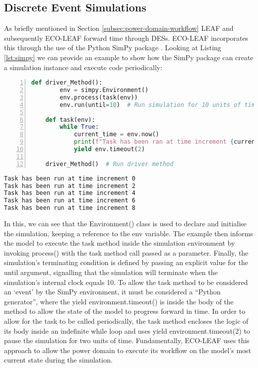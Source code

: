\documentclass{l4proj}
\begin{document}
\subsection{Discrete Event Simulations}\label{imp:subsec:des}
As briefly mentioned in Section \ref{subsec:power-domain-workflow} LEAF and subsequently ECO-LEAF forward time through DESs.
ECO-LEAF incorporates this through the use of the Python SimPy package \cite{simpy}.
Looking at Listing \ref{lst:simpy} we can provide an example to show how the SimPy package can create a simulation instance and execute code periodically:
\begin{lstlisting}[language=python, numbers=left, caption={Example use of the SimPy environment}, label=lst:simpy]
    def driver_Method():
        env = simpy.Environment()
        env.process(task(env))
        env.run(until=10)  # Run simulation for 10 units of time

    def task(env):
        while True:
            current_time = env.now()
            print(f"Task has been ran at time increment {current_time}")
            yield env.timeout(2)

    driver_Method()  # Run driver method
\end{lstlisting}
\begin{lstlisting}[language=TeX, caption={Terminal output of Listing \ref{lst:simpy}}, label=lst:simpy-output]
Task has been run at time increment 0
Task has been run at time increment 2
Task has been run at time increment 4
Task has been run at time increment 6
Task has been run at time increment 8
\end{lstlisting}

In this, we can see that the Environment() class is used to declare and initialise the simulation, keeping a reference to the env variable.
The example then informs the model to execute the task method inside the simulation environment by invoking process() with the task method call passed as a parameter.
Finally, the simulation's terminating condition is defined by passing an explicit value for the until argument, signalling that the simulation will terminate when the simulation's internal clock equals 10.
To allow the task method to be considered an `event' by the SimPy environment, it must be considered a ``Python generator'', where the yield environment.timeout() is inside the body of the method to allow the state of the model to progress forward in time.
In order to allow for the task to be called periodically, the task method encloses the logic of its body inside an indefinite while loop and uses yield environment.timeout(2) to pause the simulation for two units of time.
Fundamentally, ECO-LEAF uses this approach to allow the power domain to execute its workflow on the model's most current state during the simulation.
\end{document}
